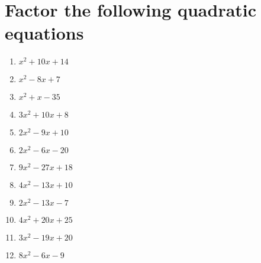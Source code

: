 \documentclass[12pt]{article}
\begin{document}
\section*{Factor the following quadratic equations}
\begin{minipage}[t]{0.45\textwidth}
    \begin{enumerate}[\#1)]
        \setcounter{enumi}{0} %
        \item  $x^2+10x+14$
        \vspace{1em}
        \item  $x^2-8x+7$
        \vspace{1em}
        \item  $x^2+x-35$
        \vspace{1em}
        \item  $3x^2+10x+8$
        \vspace{1em}
        \item  $2x^2-9x+10$
        \vspace{1em}
        \item  $2x^2-6x-20$
        \end{enumerate}
\end{minipage}%
\hspace{1cm}
\begin{minipage}[t]{0.45\textwidth}
    \begin{enumerate}[\#1)]
        \setcounter{enumi}{6} %
        \item  $9x^2-27x+18$
        \vspace{1em}
        \item  $4x^2-13x+10$
        \vspace{1em}
        \item  $2x^2-13x-7$
        \vspace{1em}
        \item  $4x^2+20x+25$
        \vspace{1em}
        \item  $3x^2-19x+20$
        \vspace{1em}
        \item  $8x^2-6x-9$

    \end{enumerate}
\end{minipage}

\begin{comment}
Notes:
- make ++ to ++, -- to +- table etc
- double check forms
- connect to zeros
- similar thing but a is not 1 as before
- show how graph is affected
- (x-m)(x-n) to (x+m)(x+n)
- backwards and expand to quadratic
- factor vs quadratic formula worksheet
\end{comment}
\end{document}
